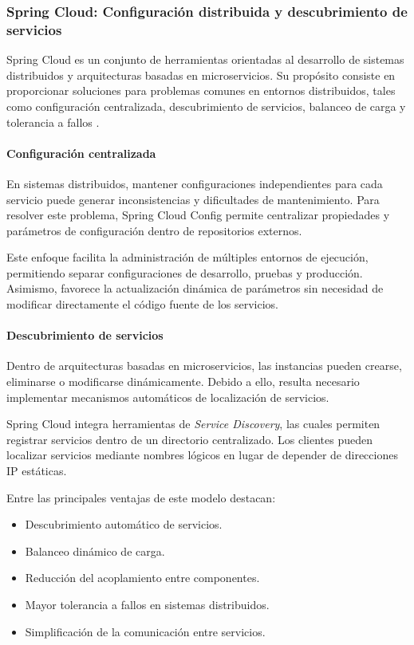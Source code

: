 \subsubsection{Spring Cloud: Configuración distribuida y descubrimiento de servicios}

Spring Cloud es un conjunto de herramientas orientadas al desarrollo de sistemas distribuidos y arquitecturas basadas en microservicios. Su propósito consiste en proporcionar soluciones para problemas comunes en entornos distribuidos, tales como configuración centralizada, descubrimiento de servicios, balanceo de carga y tolerancia a fallos \cite{53}.

\paragraph{Configuración centralizada}

En sistemas distribuidos, mantener configuraciones independientes para cada servicio puede generar inconsistencias y dificultades de mantenimiento. Para resolver este problema, Spring Cloud Config permite centralizar propiedades y parámetros de configuración dentro de repositorios externos.

Este enfoque facilita la administración de múltiples entornos de ejecución, permitiendo separar configuraciones de desarrollo, pruebas y producción. Asimismo, favorece la actualización dinámica de parámetros sin necesidad de modificar directamente el código fuente de los servicios.

\paragraph{Descubrimiento de servicios}

Dentro de arquitecturas basadas en microservicios, las instancias pueden crearse, eliminarse o modificarse dinámicamente. Debido a ello, resulta necesario implementar mecanismos automáticos de localización de servicios.

Spring Cloud integra herramientas de \textit{Service Discovery}, las cuales permiten registrar servicios dentro de un directorio centralizado. Los clientes pueden localizar servicios mediante nombres lógicos en lugar de depender de direcciones IP estáticas.

Entre las principales ventajas de este modelo destacan:

\begin{itemize}
\item Descubrimiento automático de servicios.
\item Balanceo dinámico de carga.
\item Reducción del acoplamiento entre componentes.
\item Mayor tolerancia a fallos en sistemas distribuidos.
\item Simplificación de la comunicación entre servicios.
\end{itemize}

